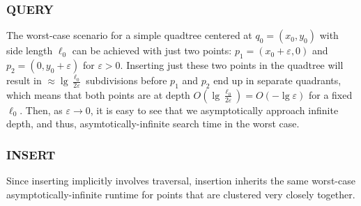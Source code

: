 \documentclass[12pt]{article}
\begin{document}
%                
%        
%        
        \subsubsection{QUERY}
            The worst-case scenario for a simple quadtree centered at $q_0 = (x_0, y_0)$ with side length $\ell_0$ can be achieved with just two points: $p_1 = (x_0 + \varepsilon, 0)$ and $p_2 = (0, y_0 + \varepsilon)$ for $\varepsilon > 0$. Inserting just these two points in the quadtree will result in $\approx \lg \frac{\ell_0}{2\varepsilon}$ subdivisions before $p_1$ and $p_2$ end up in separate quadrants, which means that both points are at depth $O(\lg \frac{\ell_0}{2\varepsilon}) = O(-\lg \varepsilon)$ for a fixed $\ell_0$. Then, as $\varepsilon \to 0$, it is easy to see that we asymptotically approach infinite depth, and thus, asymtotically-infinite search time in the worst case.
        \subsubsection{INSERT}
            Since inserting implicitly involves traversal, insertion inherits the same worst-case asymptotically-infinite runtime for points that are clustered very closely together.
\end{document}
